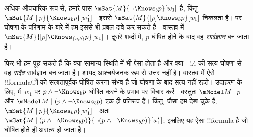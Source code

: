 \documentclass[../../../include/open-logic-section]{subfiles}
\begin{document}
अधिक औपचारिक रूप से, हमारे पास $\mSat{M}{\lnot \Knows_b p}[w_1]$ है,
किंतु $\mSat{M \mid p}{\Knows_b p}[w'_1]$। इससे
$\mSat{M}{[p] \Knows_b p}[w_1]$ निकलता है। पर घोषणा के परिणाम के बारे में
हम इससे भी प्रबल दावे कर सकते हैं। वास्तव में
$\mSat{M}{[p]\CKnows_{\{a,b\}} p}[w_1]$। दूसरे शब्दों में, $p$ घोषित होने
के बाद वह \emph{सार्वज्ञान} बन जाता है।

फिर भी हम पूछ सकते हैं कि क्या सामान्य स्थिति में भी ऐसा होता है और क्या
~$!A$ की सत्य घोषणा से वह \emph{सदैव} सार्वज्ञान बन जाता है। शायद आश्चर्यजनक
रूप से उत्तर नहीं है। वास्तव में ऐसे !!{formula}ों को सत्यतापूर्वक घोषित करना
संभव है जो घोषणा के बाद सत्य नहीं रहते। उदाहरण के लिए,
 में~$w_1$ पर
$p \land \lnot \Knows_b p$ घोषित करने के प्रभाव पर विचार करें। वस्तुतः
$\mModel M \mid p$ और $\mModel M \mid (p \land \lnot \Knows_b p)$ एक ही
प्रतिरूप हैं। किंतु, जैसा हम देख चुके हैं,
$\mSat{M \mid p}{\Knows_b p}[w'_1]$। अतः
$\mSat{M \mid (p \land \lnot \Knows_b p)}{\lnot
(p \land \lnot \Knows_b p)}[w'_1]$; इसलिए यह ऐसा !!{formula} है जो घोषित
होते ही असत्य हो जाता है।
\end{document}
